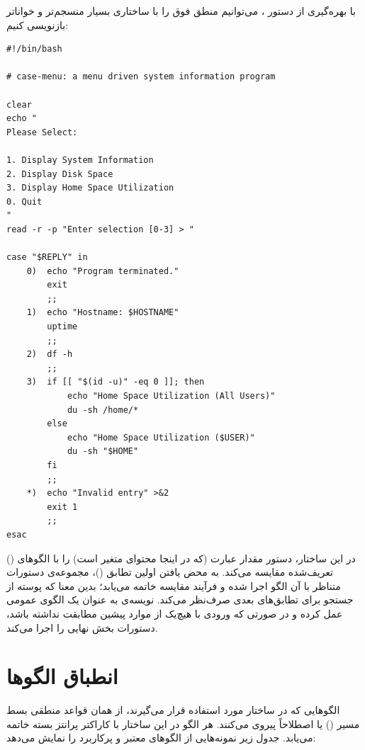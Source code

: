 با بهره‌گیری از دستور ، می‌توانیم منطق فوق را با ساختاری بسیار منسجم‌تر و خواناتر بازنویسی کنیم:

\begin{latin}
\begin{lstlisting}
#!/bin/bash

# case-menu: a menu driven system information program

clear
echo "
Please Select:

1. Display System Information
2. Display Disk Space
3. Display Home Space Utilization
0. Quit
"
read -r -p "Enter selection [0-3] > "

case "$REPLY" in
    0)  echo "Program terminated."
        exit
        ;;
    1)  echo "Hostname: $HOSTNAME"
        uptime
        ;;
    2)  df -h
        ;;
    3)  if [[ "$(id -u)" -eq 0 ]]; then
            echo "Home Space Utilization (All Users)"
            du -sh /home/*
        else
            echo "Home Space Utilization ($USER)"
            du -sh "$HOME"
        fi
        ;;
    *)  echo "Invalid entry" >&2
        exit 1
        ;;
esac
\end{lstlisting}
\end{latin}

در این ساختار، دستور  مقدار عبارت  (که در اینجا محتوای متغیر  است) را با الگوهای () تعریف‌شده مقایسه می‌کند. به محض یافتن اولین تطابق ()، مجموعه‌ی دستورات متناظر با آن الگو اجرا شده و فرآیند مقایسه خاتمه می‌یابد؛ بدین معنا که پوسته از جستجو برای تطابق‌های بعدی صرف‌نظر می‌کند. نویسه‌ی \cmd{*} به عنوان یک الگوی عمومی عمل کرده و در صورتی که ورودی با هیچ‌یک از موارد پیشین مطابقت نداشته باشد، دستورات بخش نهایی را اجرا می‌کند.

\section{انطباق الگوها}

الگوهایی که در ساختار  مورد استفاده قرار می‌گیرند، از همان قواعد منطقی بسط مسیر () یا اصطلاحاً  پیروی می‌کنند. هر الگو در این ساختار با کاراکتر پرانتز بسته \cmd{)} خاتمه می‌یابد. جدول زیر نمونه‌هایی از الگوهای معتبر و پرکاربرد را نمایش می‌دهد:


